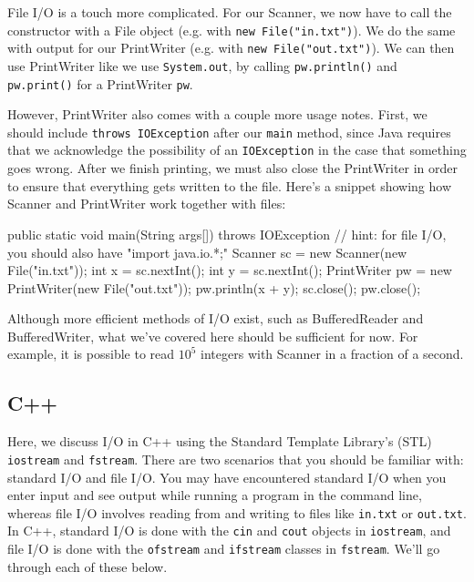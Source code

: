 File I/O is a touch more complicated. For our Scanner, we now have to call the constructor with a File object (e.g. with \texttt{new File("in.txt")}). We do the same with output for our PrintWriter (e.g. with \texttt{new File("out.txt")}). We can then use PrintWriter like we use \texttt{System.out}, by calling \texttt{pw.println()} and \texttt{pw.print()} for a PrintWriter \texttt{pw}.

However, PrintWriter also comes with a couple more usage notes. First, we should include \texttt{throws IOException} after our \texttt{main} method, since Java requires that we acknowledge the possibility of an \texttt{IOException} in the case that something goes wrong. After we finish printing, we must also close the PrintWriter in order to ensure that everything gets written to the file. Here's a snippet showing how Scanner and PrintWriter work together with files: 

\begin{mylstlisting}
public static void main(String args[]) throws IOException {
  // hint: for file I/O, you should also have "import java.io.*;"
  Scanner sc = new Scanner(new File("in.txt"));
  int x = sc.nextInt();
  int y = sc.nextInt();
  PrintWriter pw = new PrintWriter(new File("out.txt"));
  pw.println(x + y);
  sc.close();
  pw.close();
}
\end{mylstlisting}

Although more efficient methods of I/O exist, such as BufferedReader and BufferedWriter, what we've covered here should be sufficient for now. For example, it is possible to read $10^5$ integers with Scanner in a fraction of a second.

\subsection{C++}

Here, we discuss I/O in C++ using the Standard Template Library's (STL) \texttt{iostream} and \texttt{fstream}. There are two scenarios that you should be familiar with: standard I/O and file I/O. You may have encountered standard I/O when you enter input and see output while running a program in the command line, whereas file I/O involves reading from and writing to files like \texttt{in.txt} or \texttt{out.txt}. In C++, standard I/O is done with the \texttt{cin} and \texttt{cout} objects in \texttt{iostream}, and file I/O is done with the \texttt{ofstream} and \texttt{ifstream} classes in \texttt{fstream}. We'll go through each of these below.

